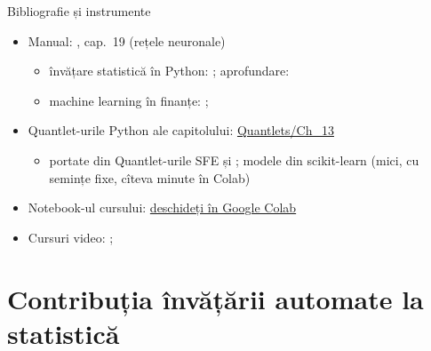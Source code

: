 \begin{frame}{Bibliografie și instrumente}
\itemsize{\small}
\begin{itemize}
    \item Manual: , cap.~19 (rețele neuronale)
    \begin{itemize}
        \item învățare statistică în Python: ; aprofundare: 
        \item machine learning în finanțe: ; 
    \end{itemize}
    \item Quantlet-urile Python ale capitolului: \href{https://github.com/danpele/SFM/tree/main/Quantlets/Ch_13}{Quantlets/Ch\_13}
    \begin{itemize}
        \item portate din Quantlet-urile SFE  și ; modele din scikit-learn (mici, cu semințe fixe, cîteva minute în Colab)
    \end{itemize}
    \item Notebook-ul cursului: \href{\colaburl{notebooks/EN/chapter13_lecture_notebook.ipynb}}{deschideți în Google Colab}
    \item Cursuri video: ; 
\end{itemize}
\end{frame}


\section{Contribuția învățării automate la statistică}


